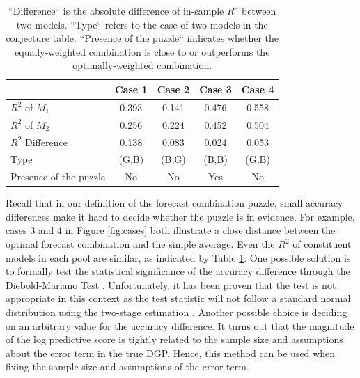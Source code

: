 \documentclass{monashthesis}
\begin{document}
\begin{table}[ht]
  \centering
    \begin{tabular}{l|cccc}
    \toprule
                              &    Case 1    &    Case 2   &    Case 3    &    Case 4   \\  
    \midrule
    $R^2$ of $M_1$            &    0.393     &    0.141    &    0.476     &    0.558    \\
    $R^2$ of $M_2$            &    0.256     &    0.224    &    0.452     &    0.504    \\
    $R^2$ Difference          &    0.138     &    0.083    &    0.024     &    0.053    \\
    Type                      &    (G,B)     &    (B,G)    &    (B,B)     &    (G,B)    \\
    Presence of the puzzle    &     No       &     No      &     Yes      &     No     \\
    \bottomrule
    \end{tabular}
    \caption{``Difference`` is the absolute difference of in-sample $R^2$ between two models. ``Type`` refers to the case of two models in the conjecture table. ``Presence of the puzzle`` indicates whether the equally-weighted combination is close to or outperforms the optimally-weighted combination.}
  \label{tab:cases}
\end{table}

Recall that in our definition of the forecast combination puzzle, small accuracy differences make it hard to decide whether the puzzle is in evidence. For example, cases 3 and 4 in Figure \ref{fig:cases} both illustrate a close distance between the optimal forecast combination and the simple average. Even the \(R^2\) of constituent models in each pool are similar, as indicated by Table \ref{tab:cases}. One possible solution is to formally test the statistical significance of the accuracy difference through the Diebold-Mariano Test \autocite{D15}. Unfortunately, it has been proven that the test is not appropriate in this context as the test statistic will not follow a standard normal distribution using the two-stage estimation \autocite{FZMP23}. Another possible choice is deciding on an arbitrary value for the accuracy difference. It turns out that the magnitude of the log predictive score is tightly related to the sample size and assumptions about the error term in the true DGP. Hence, this method can be used when fixing the sample size and assumptions of the error term.
\end{document}
